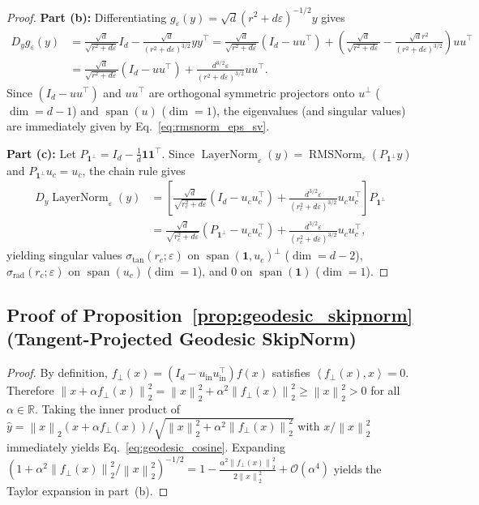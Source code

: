 \documentclass[10pt]{article}
\theoremstyle{definition}
\theoremstyle{remark}
\newcommand{\R}{\mathbb{R}}
\newcommand{\norm}[1]{\left\lVert #1 \right\rVert}
\newcommand{\inner}[1]{\left\langle #1 \right\rangle}
\begin{document}
\begin{proof}
\textbf{Part (b):} Differentiating $g_\varepsilon(y) = \sqrt{d} (r^2 + d\varepsilon)^{-1/2} y$ gives
\begin{align}
    D_y g_\varepsilon(y) &= \frac{\sqrt{d}}{\sqrt{r^2 + d\varepsilon}} I_d - \frac{\sqrt{d}}{(r^2 + d\varepsilon)^{3/2}} y y^\top
    = \frac{\sqrt{d}}{\sqrt{r^2 + d\varepsilon}} (I_d - u u^\top) + \left( \frac{\sqrt{d}}{\sqrt{r^2 + d\varepsilon}} - \frac{\sqrt{d} r^2}{(r^2 + d\varepsilon)^{3/2}} \right) u u^\top \nonumber \\
    &= \frac{\sqrt{d}}{\sqrt{r^2 + d\varepsilon}} (I_d - u u^\top) + \frac{d^{3/2} \varepsilon}{(r^2 + d\varepsilon)^{3/2}} u u^\top.
\end{align}
Since $(I_d - u u^\top)$ and $u u^\top$ are orthogonal symmetric projectors onto $u^\perp$ ($\dim = d-1$) and $\operatorname{span}(u)$ ($\dim = 1$), the eigenvalues (and singular values) are immediately given by Eq.~\eqref{eq:rmsnorm_eps_sv}.

\textbf{Part (c):} Let $P_{\mathbf{1}^\perp} = I_d - \frac{1}{d}\mathbf{1}\mathbf{1}^\top$. Since $\operatorname{LayerNorm}_\varepsilon(y) = \operatorname{RMSNorm}_\varepsilon(P_{\mathbf{1}^\perp} y)$ and $P_{\mathbf{1}^\perp} u_c = u_c$, the chain rule gives
\begin{align}
    D_y \operatorname{LayerNorm}_\varepsilon(y) &= \left[ \frac{\sqrt{d}}{\sqrt{r_c^2 + d\varepsilon}} (I_d - u_c u_c^\top) + \frac{d^{3/2}\varepsilon}{(r_c^2 + d\varepsilon)^{3/2}} u_c u_c^\top \right] P_{\mathbf{1}^\perp} \nonumber \\
    &= \frac{\sqrt{d}}{\sqrt{r_c^2 + d\varepsilon}} (P_{\mathbf{1}^\perp} - u_c u_c^\top) + \frac{d^{3/2}\varepsilon}{(r_c^2 + d\varepsilon)^{3/2}} u_c u_c^\top,
\end{align}
yielding singular values $\sigma_{\mathrm{tan}}(r_c; \varepsilon)$ on $\operatorname{span}(\mathbf{1}, u_c)^\perp$ ($\dim = d-2$), $\sigma_{\mathrm{rad}}(r_c; \varepsilon)$ on $\operatorname{span}(u_c)$ ($\dim = 1$), and $0$ on $\operatorname{span}(\mathbf{1})$ ($\dim = 1$).
\end{proof}

\subsection{Proof of Proposition~\ref{prop:geodesic_skipnorm} (Tangent-Projected Geodesic SkipNorm)}

\begin{proof}
By definition, $f_\perp(x) = (I_d - u_{\mathrm{in}} u_{\mathrm{in}}^\top) f(x)$ satisfies $\inner{f_\perp(x), x} = 0$. Therefore $\norm{x + \alpha f_\perp(x)}_2^2 = \norm{x}_2^2 + \alpha^2 \norm{f_\perp(x)}_2^2 \ge \norm{x}_2^2 > 0$ for all $\alpha \in \R$. Taking the inner product of $\hat{y} = \norm{x}_2 (x + \alpha f_\perp(x)) / \sqrt{\norm{x}_2^2 + \alpha^2 \norm{f_\perp(x)}_2^2}$ with $x / \norm{x}_2^2$ immediately yields Eq.~\eqref{eq:geodesic_cosine}. Expanding $(1 + \alpha^2 \norm{f_\perp(x)}_2^2 / \norm{x}_2^2)^{-1/2} = 1 - \frac{\alpha^2 \norm{f_\perp(x)}_2^2}{2\norm{x}_2^2} + \mathcal{O}(\alpha^4)$ yields the Taylor expansion in part~(b).
\end{proof}
\end{document}

